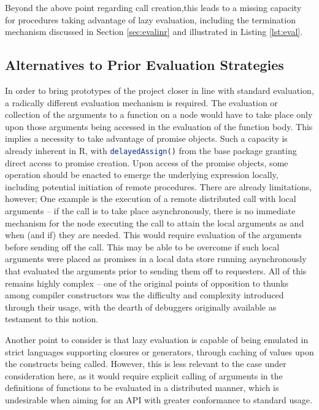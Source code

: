 Beyond the above point regarding call creation,this leads to a missing capacity for procedures taking advantage of lazy evaluation, including the termination mechanism discussed in Section \cref{sec:evalinr} and illustrated in Listing \cref{lst:eval}.

\subsection{Alternatives to Prior Evaluation Strategies}

In order to bring prototypes of the project closer in line with standard \R evaluation, a radically different evaluation mechanism is required.
The evaluation or collection of the arguments to a function on a node would have to take place only upon those arguments being accessed in the evaluation of the function body.
This implies a necessity to take advantage of promise objects.
Such a capacity is already inherent in R, with \lstinline[language=R]{delayedAssign()} from the base package granting direct access to promise creation.
Upon access of the promise objects, some operation should be enacted to emerge the underlying expression locally, including potential initiation of remote procedures.
There are already limitations, however;
One example is the execution of a remote distributed call with local arguments -- if the call is to take place asynchronously, there is no immediate mechanism for the node executing the call to attain the local arguments as and when (and if) they are needed.
This would require evaluation of the arguments before sending off the call.
This may be able to be overcome if such local arguments were placed as promises in a local data store running asynchronously that evaluated the arguments prior to sending them off to requesters.
All of this remains highly complex -- one of the original points of opposition to thunks \cite{ingerman1961thunks}among compiler constructors was the difficulty and complexity introduced through their usage, with the dearth of debuggers originally available as testament to this notion.

Another point to consider is that lazy evaluation is capable of being emulated in strict languages supporting closures or generators, through caching of values upon the constructs being called.
However, this is less relevant to the case under consideration here, as it would require explicit calling of arguments in the definitions of functions to be evaluated in a distributed manner, which is undesirable when aiming for an API with greater conformance to standard \R usage.

